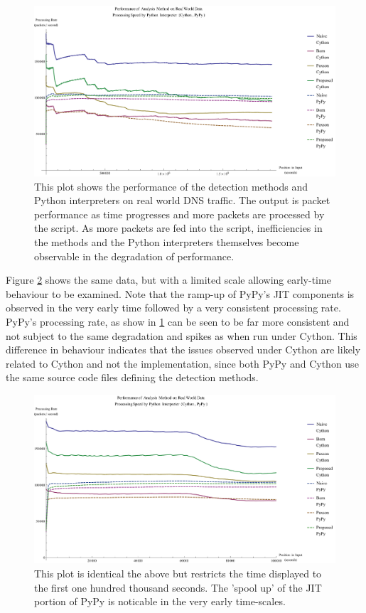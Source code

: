 \documentclass[12pt]{report}
\theoremstyle{remark}
\theoremstyle{definition}
\theoremstyle{definition}
\theoremstyle{definition}
\begin{document}
\begin{figure}
\centering
\includegraphics[width=\textwidth]{figures/pmqr.pdf}
\caption[Performance of Analysis Method and Python Interpreter on Real World
Data]{This plot shows the performance of the detection methods and Python
interpreters on real world DNS traffic. The output is packet performance as time
progresses and more packets are processed by the script. As more packets are fed
into the script, inefficiencies in the methods and the Python interpreters
themselves become observable in the degradation of performance.}
\label{pmqr}
\end{figure}

Figure \ref{pmqr-100k} shows the same data, but with a limited scale allowing
early-time behaviour to be examined. Note that the ramp-up of PyPy's JIT
components is observed in the very early time followed by a very consistent
processing rate. PyPy's processing rate, as show in \ref{pmqr} can be seen to be
far more consistent and not subject to the same degradation and spikes as when
run under Cython. This difference in behaviour indicates that the issues
observed under Cython are likely related to Cython and not the implementation,
since both PyPy and Cython use the same source code files defining the detection
methods.

\begin{figure}
\centering
\includegraphics[width=\textwidth]{figures/pmqr-100k.pdf}
\caption[Performance of Analysis Method and Python Interpreter on Real World
Data - Early Time]{This plot is identical the above but restricts the time
displayed to the first one hundred thousand seconds. The 'spool up' of the JIT
portion of PyPy is noticable in the very early time-scales.}
\label{pmqr-100k}
\end{figure}
\end{document}
